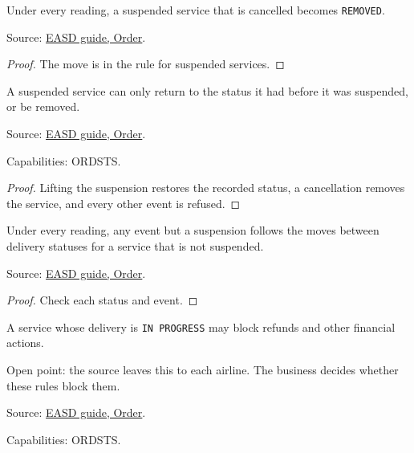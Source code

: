 \begin{theorem}
  \label{thm:delivery-suspended-cancel}
  Under every reading, a suspended service that is cancelled becomes
  \texttt{REMOVED}.

  Source: \href{https://standards.atlassian.net/wiki/spaces/EASD/pages/574849062/Order}{EASD guide, Order}.
\end{theorem}
\begin{proof}
  The move is in the rule for suspended services.
\end{proof}

\begin{theorem}
  \label{thm:c09-suspended}
  A suspended service can only return to the status it had before it was
  suspended, or be removed.

  Source: \href{https://standards.atlassian.net/wiki/spaces/EASD/pages/574849062/Order}{EASD guide, Order}.

  Capabilities: ORDSTS.
\end{theorem}
\begin{proof}
  Lifting the suspension restores the recorded status, a cancellation
  removes the service, and every other event is refused.
\end{proof}

\begin{theorem}
  \label{thm:delivery-step-follows-table}
  Under every reading, any event but a suspension follows the moves between
  delivery statuses for a service that is not suspended.

  Source: \href{https://standards.atlassian.net/wiki/spaces/EASD/pages/574849062/Order}{EASD guide, Order}.
\end{theorem}
\begin{proof}
  Check each status and event.
\end{proof}

\begin{definition}
  \label{def:c10-in-progress}
  \notready
  A service whose delivery is \texttt{IN PROGRESS} may block refunds and other
  financial actions.

  Open point: the source leaves this to each airline.  The business decides
  whether these rules block them.

  Source: \href{https://standards.atlassian.net/wiki/spaces/EASD/pages/574849062/Order}{EASD guide, Order}.

  Capabilities: ORDSTS.
\end{definition}

